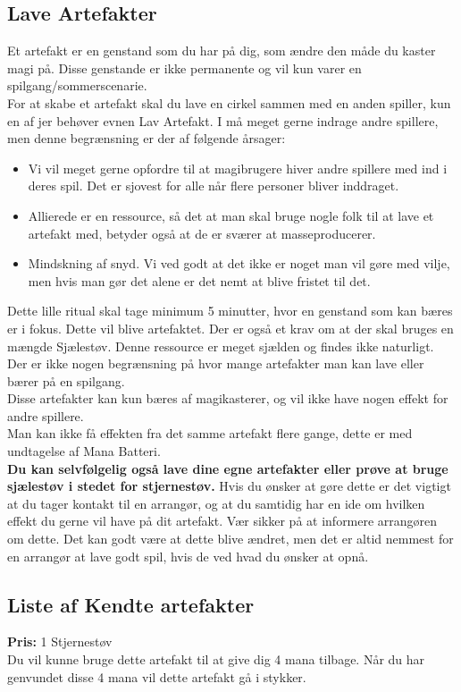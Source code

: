 \subsection{Lave Artefakter}

Et artefakt er en genstand som du har på dig, som ændre den måde du kaster magi på. Disse genstande er ikke permanente og vil kun varer en spilgang/sommerscenarie. \\
For at skabe et artefakt skal du lave en cirkel sammen med en anden spiller, kun en af jer behøver evnen Lav Artefakt. I må meget gerne indrage andre spillere, men denne begrænsning er der af følgende årsager:\\
\begin{itemize}
    \item Vi vil meget gerne opfordre  til at magibrugere hiver andre spillere med ind i deres spil. Det er sjovest for alle når flere personer bliver inddraget.
    \item Allierede er en ressource, så det at man skal bruge nogle folk til at lave et artefakt med, betyder også at de er sværer at masseproducerer.
    \item Mindskning af snyd. Vi ved godt at det ikke er noget man vil gøre med vilje, men hvis man gør det alene er det nemt at blive fristet til det.
\end{itemize}
Dette lille ritual skal tage minimum 5 minutter, hvor en genstand som kan bæres er i fokus. Dette vil blive artefaktet. Der er også et krav om at der skal bruges en mængde Sjælestøv. Denne ressource er meget sjælden og findes ikke naturligt. Der er ikke nogen begrænsning på hvor mange artefakter man kan lave eller bærer på en spilgang.\\ 
Disse artefakter kan kun bæres af magikasterer, og vil ikke have nogen effekt for andre spillere.\\
Man kan ikke få effekten fra det samme artefakt flere gange, dette er med undtagelse af Mana Batteri.\\ 

\textbf{Du kan selvfølgelig også lave dine egne artefakter eller prøve at bruge sjælestøv i stedet for stjernestøv.} Hvis du ønsker at gøre dette er det vigtigt at du tager kontakt til en arrangør, og at du samtidig har en ide om hvilken effekt du gerne vil have på dit artefakt. Vær sikker på at informere arrangøren om dette. Det kan godt være at dette blive ændret, men det er altid nemmest for en arrangør at lave godt spil, hvis de ved hvad du ønsker at opnå.

\subsection*{Liste af Kendte artefakter}
\begin{artefakt*}
\textbf{Pris:} 1 Stjernestøv\\
Du vil kunne bruge dette artefakt til at give dig 4 mana tilbage. Når du har genvundet disse 4 mana vil dette artefakt gå i stykker.
\end{artefakt*}

